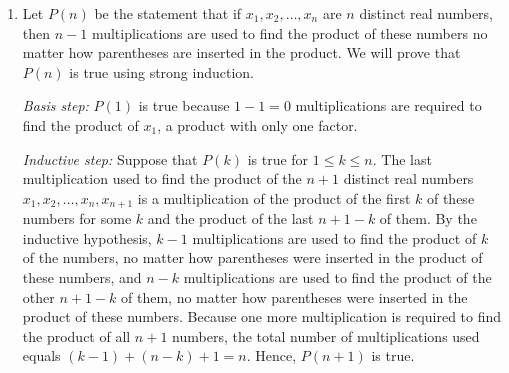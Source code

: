 \documentclass{../../cls/sig-alternate-05-2015}
\begin{document}
\begin{enumerate}
\item Let $P(n)$ be the statement that if $x_1, x_2, \ldots, x_n$ are $n$ distinct real numbers, then $n - 1$ multiplications are used to find the product of these numbers no matter how parentheses are inserted in the product.
We will prove that $P(n)$ is true using strong induction.

\textit{Basis step:} $P(1)$ is true because $1 - 1 = 0$
multiplications are required to find the product of $x_1$,
a product with only one factor.

\textit{Inductive step:} Suppose that $P(k)$ is true for $1 \le k \le n$.
The last multiplication used to find the product of the $n + 1$
distinct real numbers $x_1, x_2, \ldots, x_n, x_{n + 1}$ is a multiplication of the product of the first $k$ of these numbers for some $k$ and the product of the last $n + 1 - k$ of them.
By the inductive hypothesis,
$k - 1$ multiplications are used to find the product of $k$ of the numbers,
no matter how parentheses were inserted in the product of these numbers,
and $n - k$ multiplications are used to find the product of the other $n + 1 - k$ of them,
no matter how parentheses were inserted in the product of these
numbers.
Because one more multiplication is required to find the product of all $n + 1$ numbers,
the total number of multiplications used equals $(k - 1) + (n - k) + 1 = n$.
Hence, $P(n + 1)$ is true.

\end{enumerate}
\end{document}
